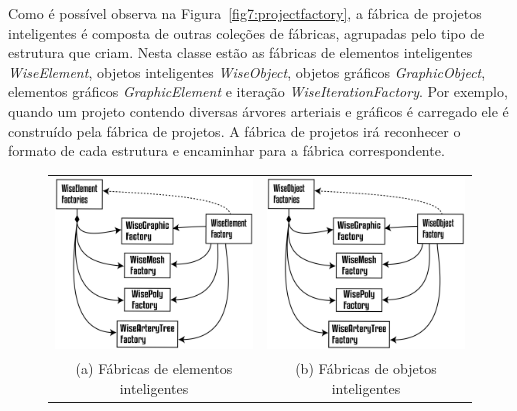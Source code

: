\documentclass[a4paper,12pt]{monografia}
\theoremstyle{plain}
\theoremstyle{definition}
\theoremstyle{remark}
\begin{document}
Como é possível observa na Figura~\ref{fig7:projectfactory}, a fábrica de projetos inteligentes é composta de outras coleções de fábricas, agrupadas pelo tipo de estrutura que criam. Nesta classe estão as fábricas de elementos inteligentes \textit{WiseElement}, objetos inteligentes \textit{WiseObject}, objetos gráficos \textit{GraphicObject}, elementos gráficos \textit{GraphicElement} e iteração \textit{WiseIterationFactory}. Por exemplo, quando um projeto contendo diversas árvores arteriais e gráficos é carregado ele é construído pela fábrica de projetos. A fábrica de projetos irá reconhecer o formato de cada estrutura e encaminhar para a fábrica correspondente.

\begin{figure}
	\begin{tabular}{cc}
		\includegraphics[width=0.5\linewidth]{Figures/WiseElementFactories@16x.png} &   \includegraphics[width=0.5\linewidth]{Figures/WiseObjectFactories@16x.png} \\
		(a) Fábricas de elementos inteligentes & (b) Fábricas de objetos inteligentes \\[6pt]

\end{tabular}
\end{figure}
\end{document}
